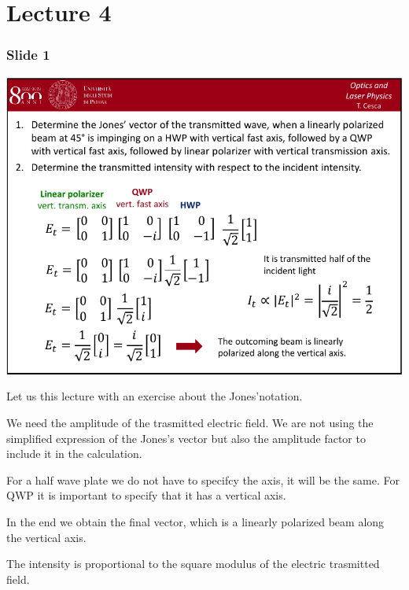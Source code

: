 \documentclass[../main/main.tex]{subfiles}
\begin{document}
\pagestyle{plain}

\section{Lecture 4}


\subsubsection*{Slide 1}

\begin{minipage}[]{0.5\linewidth}
\centering
\includegraphics[page=1,width=1\textwidth]{../lessons/pdf_file/04_lecture.pdf}
\end{minipage}
\hspace{0.3cm}\vspace{0.3cm}
\begin{minipage}[c]{0.47\linewidth}
Let us this lecture with an exercise about the Jones'notation.

We need the amplitude of the trasmitted electric field. We are not using the simplified expression of the Jones's vector but also the amplitude factor to include it in the calculation.

For a half wave plate we do not have to specifcy the axis, it will be the same. For QWP it is important to specify that it has a vertical axis.

In the end we obtain the final vector, which is a linearly polarized beam along the vertical axis.

The intensity is proportional to the square modulus of the electric trasmitted field.

\end{minipage}
\end{document}
